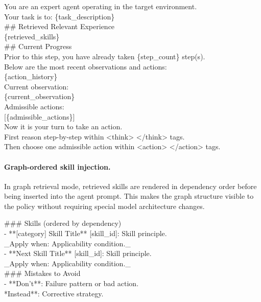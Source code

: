 \begin{tcolorbox}[colback=gray!5, colframe=gray!60, title={\small\textbf{Agent Prompt Template}}, fontupper=\small\ttfamily, breakable, left=4pt, right=4pt, top=2pt, bottom=2pt]
You are an expert agent operating in the target environment.\\
Your task is to: \{task\_description\}\\[4pt]
\#\# Retrieved Relevant Experience\\[2pt]
\{retrieved\_skills\}\\[4pt]
\#\# Current Progress\\[2pt]
Prior to this step, you have already taken \{step\_count\} step(s).\\
Below are the most recent observations and actions:\\
\{action\_history\}\\[4pt]
Current observation:\\
\{current\_observation\}\\[4pt]
Admissible actions:\\
{[}\{admissible\_actions\}{]}\\[4pt]
Now it is your turn to take an action.\\
First reason step-by-step within <think> </think> tags.\\
Then choose one admissible action within <action> </action> tags.
\end{tcolorbox}

\paragraph{Graph-ordered skill injection.}
In graph retrieval mode, retrieved skills are rendered in dependency order before being inserted into the agent prompt. This makes the graph structure visible to the policy without requiring special model architecture changes.

\begin{tcolorbox}[colback=blue!3, colframe=blue!40, title={\small\textbf{Graph-Ordered Skill Block}}, fontupper=\small\ttfamily, breakable, left=4pt, right=4pt, top=2pt, bottom=2pt]
\#\#\# Skills (ordered by dependency)\\
- **[category] Skill Title** [skill\_id]: Skill principle.\\
\quad\_Apply when: Applicability condition.\_\\
- **Next Skill Title** [skill\_id]: Skill principle.\\
\quad\_Apply when: Applicability condition.\_\\[4pt]
\#\#\# Mistakes to Avoid\\
- **Don't**: Failure pattern or bad action.\\
\quad**Instead**: Corrective strategy.
\end{tcolorbox}

